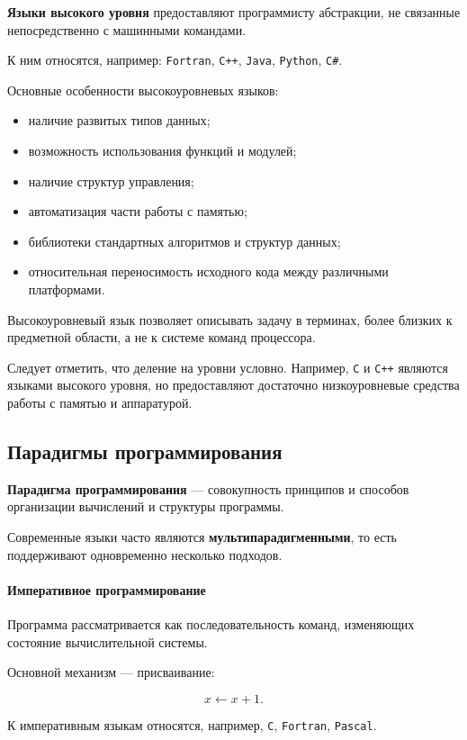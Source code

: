 \textbf{Языки высокого уровня} предоставляют программисту абстракции, не связанные непосредственно с машинными командами.

К ним относятся, например:
\texttt{Fortran}, \texttt{C++}, \texttt{Java}, \texttt{Python}, \texttt{C\#}.

Основные особенности высокоуровневых языков:
\begin{itemize}
	\item наличие развитых типов данных;
	\item возможность использования функций и модулей;
	\item наличие структур управления;
	\item автоматизация части работы с памятью;
	\item библиотеки стандартных алгоритмов и структур данных;
	\item относительная переносимость исходного кода между различными платформами.
\end{itemize}

Высокоуровневый язык позволяет описывать задачу в терминах, более близких к предметной области, а не к системе команд процессора.

Следует отметить, что деление на уровни условно. Например, \texttt{C} и \texttt{C++} являются языками высокого уровня, но предоставляют достаточно низкоуровневые средства работы с памятью и аппаратурой.


\subsection{Парадигмы программирования}

\textbf{Парадигма программирования} --- совокупность принципов и способов организации вычислений и структуры программы.

Современные языки часто являются \textbf{мультипарадигменными}, то есть поддерживают одновременно несколько подходов.

\paragraph{Императивное программирование}

Программа рассматривается как последовательность команд, изменяющих состояние вычислительной системы.

Основной механизм --- присваивание:

\[
x \leftarrow x + 1.
\]

К императивным языкам относятся, например, \texttt{C}, \texttt{Fortran}, \texttt{Pascal}.

